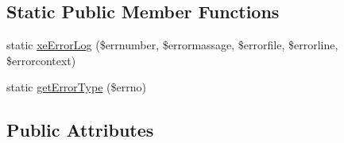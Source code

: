 \subsection*{Static Public Member Functions}
\begin{DoxyCompactItemize}
\item 
static \hyperlink{classModuleHandler_ae8a81ab7540edc526035f1375706dd7a}{xe\-Error\-Log} (\$errnumber, \$errormassage, \$errorfile, \$errorline, \$errorcontext)
\item 
static \hyperlink{classModuleHandler_a140184b247fc515e6f49eb87ff59ae74}{get\-Error\-Type} (\$errno)
\end{DoxyCompactItemize}
\subsection*{Public Attributes}
